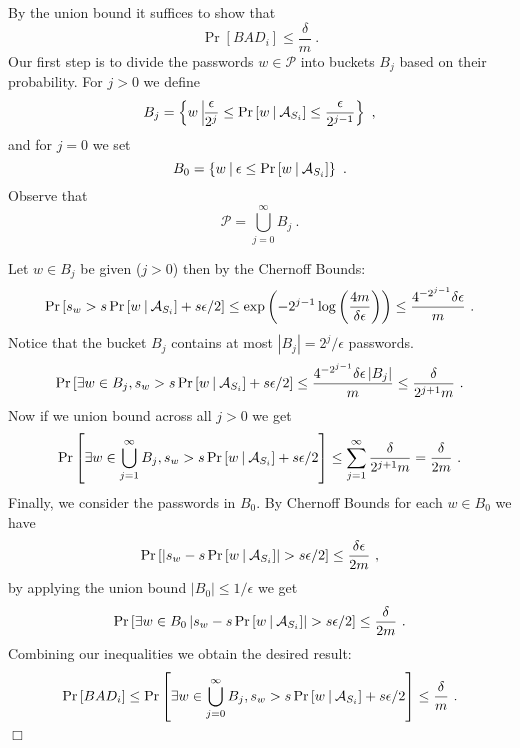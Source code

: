 \documentclass[prodmode,acmec]{ec-acmsmall}
\newcommand{\PasswordSpace}{\mathcal{P}}
\def \QED {\hfill{$\Box$}}
\newenvironment{proofof}[1]{\noindent {\em Proof of #1.  }}{\QED}
\begin{document}
\begin{proofof}{Claim \ref{claim:SamplingBadEvent}} 
By the union bound it suffices to show that 
\[ \Pr\left[BAD_i\right] \leq \frac{\delta}{m} \ . \]
Our first step is to divide the passwords $w \in \PasswordSpace$ into buckets $B_j$ based on their probability. For $j > 0$ we define
  \[ B_j = \left\{ w~\vline \frac{\epsilon}{2^{j}} \leq \Pr\left[w ~\vline ~\mathcal{A}_{S_i} \right] \leq \frac{\epsilon}{2^{j-1}} \right\} \ , \]
and for $j=0$ we set \[ B_0 = \left\{ w~\vline ~\epsilon \leq \Pr\left[w ~\vline ~\mathcal{A}_{S_i} \right]\right\}  \ . \]
Observe that 
\[ \PasswordSpace = \bigcup_{j=0}^\infty B_j \ . \]

Let $w \in B_j$ be given ($j > 0$) then by the Chernoff Bounds:
\[\Pr\left[s_w > s \Pr\left[w ~\vline ~\mathcal{A}_{S_i} \right] + s\epsilon/2  \right] \leq \exp\left(-2^{j-1} \log \left(\frac{4m}{\delta \epsilon} \right) \right) \leq \frac{4^{-2^{j-1}} \delta \epsilon}{m} \ . \]
Notice that the bucket $B_j$ contains at most $\left|B_j\right| = 2^{j}/\epsilon$ passwords. 
\[\Pr\left[\exists w \in B_j, s_w > s \Pr\left[w ~\vline ~\mathcal{A}_{S_i} \right] + s\epsilon/2  \right]  \leq \frac{4^{-2^{j-1}} \delta \epsilon\left|B_j\right|}{m} \leq  \frac{ \delta }{2^{j+1}m} \ . \]
Now if we union bound across all $j>0$ we get  
 \[\Pr\left[\exists w \in \bigcup_{j=1}^\infty B_j, s_w > s \Pr\left[w ~\vline ~\mathcal{A}_{S_i} \right] + s\epsilon/2  \right] \leq \sum_{j=1}^\infty \frac{ \delta }{2^{j+1}m} = \frac{\delta}{2m} \ . \]
Finally, we consider the passwords in $B_0$. By Chernoff Bounds for each $w \in B_0$ we have
\[\Pr\left[\left| s_w - s \Pr\left[w ~\vline ~\mathcal{A}_{S_i} \right] \right| > s\epsilon/2  \right] \leq \frac{\delta \epsilon}{2m} \ , \]
by applying the union bound $\left|B_0\right| \leq 1/\epsilon$ we get
\[\Pr\left[\exists w \in B_0 \left| s_w - s \Pr\left[w ~\vline ~\mathcal{A}_{S_i} \right] \right| > s\epsilon/2  \right] \leq \frac{\delta }{2m} \ . \]
Combining our inequalities we obtain the desired result: 
\[\Pr\left[BAD_i \right] \leq \Pr\left[\exists w \in \bigcup_{j=0}^\infty B_j, s_w > s \Pr\left[w ~\vline ~\mathcal{A}_{S_i} \right] + s\epsilon/2  \right] \leq \frac{\delta}{m} \ . \]
\end{proofof}
\end{document}
